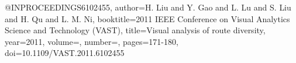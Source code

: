 @INPROCEEDINGS{6102455,
  author={H. {Liu} and Y. {Gao} and L. {Lu} and S. {Liu} and H. {Qu} and L. M. {Ni}},
  booktitle={2011 IEEE Conference on Visual Analytics Science and Technology (VAST)}, 
  title={Visual analysis of route diversity}, 
  year={2011},
  volume={},
  number={},
  pages={171-180},
  doi={10.1109/VAST.2011.6102455}}